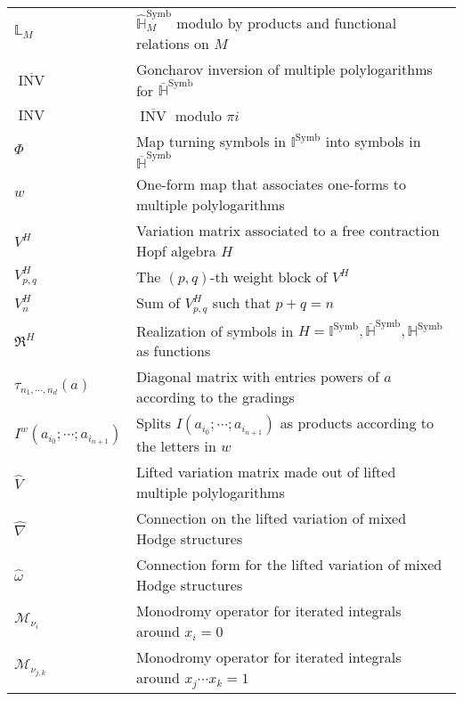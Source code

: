\documentclass[12pt]{thesis}
\theoremstyle{definition}
\DeclareMathOperator{\INV}{INV}
\DeclareMathOperator{\Symb}{Symb}
\numberwithin{equation}{section}
\numberwithin{figure}{section}
\renewcommand{\baselinestretch}{2}
\begin{document}
\begin{center}
\begin{tabular}{ m{4cm}  m{11cm} }
$\mathbb L_{M}$ & $\widehat {\mathbb H}^{\Symb}_{M}$ modulo by products and functional relations on $M$ \\
$\overline{\INV}$ & Goncharov inversion of multiple polylogarithms for $\overline{\mathbb H}^{\Symb}$ \\
$\INV$ & $\overline{\INV}$ modulo $\pi i$ \\
$\Phi$ & Map turning symbols in $\mathbb I^{\Symb}$ into symbols in $\overline{\mathbb H}^{\Symb}$\\
$w$ & One-form map that associates one-forms to multiple polylogarithms \\
\hline
$V^H$ & Variation matrix associated to a free contraction Hopf algebra $H$ \\
$V^H_{p,q}$ & The $(p,q)$-th weight block of $V^H$ \\
$V^H_n$ & Sum of $V^H_{p,q}$ such that $p+q=n$ \\
$\Re^H$ & Realization of symbols in $H=\mathbb I^{\Symb},\overline{\mathbb H}^{\Symb},\mathbb H^{\Symb}$ as functions \\
$\tau_{n_1,\cdots,n_d}(a)$ & Diagonal matrix with entries powers of $a$ according to the gradings \\
$I^w(a_{i_0};\cdots;a_{i_{n+1}})$ & Splits $I(a_{i_0};\cdots;a_{i_{n+1}})$ as products according to the letters in $w$ \\
$\widehat V$ & Lifted variation matrix made out of lifted multiple polylogarithms \\
$\widehat\nabla$ & Connection on the lifted variation of mixed Hodge structures \\
$\widehat\omega$ & Connection form for the lifted variation of mixed Hodge structures \\
\hline
$\mathcal M_{\nu_{i}}$ & Monodromy operator for iterated integrals around $x_i=0$ \\
$\mathcal M_{\nu_{j,k}}$ & Monodromy operator for iterated integrals around $x_j\cdots x_k=1$
\end{tabular}
\end{center}

\normalsize

\vspace{3pt}

\printglossary


\newpage
\setlength{\parskip}{0em}
\renewcommand{\baselinestretch}{2}
\small\normalsize

\setcounter{page}{1}
\end{document}
